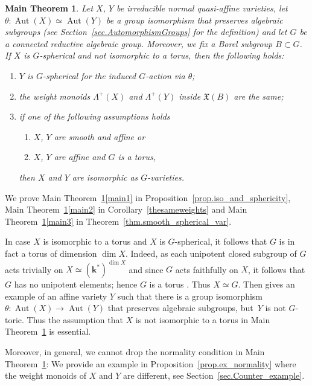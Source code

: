 \documentclass[11pt]{article}
\numberwithin{equation}{section}
\theoremstyle{plain}
\newtheorem{maintheorem}{Main Theorem}
\theoremstyle{definition}
\DeclareMathOperator{\Aut}{Aut}
\newcommand{\kk}{{\boldsymbol{k}}}
\begin{document}
\begin{maintheorem}
\label{mainthm:autos}
Let $X$, $Y$ be irreducible normal quasi-affine varieties, let
$\theta \colon \Aut(X) \simeq \Aut(Y)$ be a group isomorphism
that preserves algebraic subgroups (see Section~\ref{sec.AutomorphismGroups} for the definition)
and let $G$ be a connected reductive
algebraic group.
Moreover, we fix a Borel subgroup $B \subset G$.
If $X$ is $G$-spherical and not isomorphic to a torus, then the following holds:
\begin{enumerate}
\item \label{main1} $Y$ is $G$-spherical for the induced $G$-action via $\theta$;
\item \label{main2} the weight monoids $\Lambda^+(X)$ and $\Lambda^+(Y)$ inside $\mathfrak{X}(B)$
are the same;
\item \label{main3} if one of the following assumptions holds
\begin{enumerate}\renewcommand{\theenumii}{\roman{enumii}}
\item \label{main3smooth} $X$, $Y$ are smooth and affine or
\item \label{main3toric} $X$, $Y$ are affine and $G$ is a torus,
\end{enumerate}
then $X$ and $Y$ are isomorphic as $G$-varieties.
\end{enumerate}
\end{maintheorem}

We prove Main Theorem~\ref{mainthm:autos}\eqref{main1} in Proposition~\ref{prop.iso_and_sphericity},
Main Theorem~\ref{mainthm:autos}\eqref{main2} in Corollary~\ref{thesameweights}
and Main Theorem~\ref{mainthm:autos}\eqref{main3} in Theorem~\ref{thm.smooth_spherical_var}.

In case $X$ is isomorphic to a torus and $X$ is $G$-spherical, it follows that $G$ is in fact a torus
of dimension $\dim X$. Indeed, as each unipotent closed subgroup of $G$ acts trivially on
$X \simeq (\kk^\ast)^{\dim X}$ and since $G$ acts faithfully on $X$, it follows that $G$ has no unipotent
elements; hence $G$ is a torus \cite[Prop.\,B, \S21.4]{Hu1975Linear-algebraic-g}. Thus $X\simeq G$.
Then \cite[Exam.\,6.17]{LiReUr2018Characterization-o} gives an example
of an affine variety $Y$ such that there is a group isomorphism $\theta \colon \Aut(X) \to \Aut(Y)$
that preserves algebraic subgroups, but~$Y$ is not $G$-toric. Thus the assumption that $X$ is
not isomorphic to a torus in Main Theorem~\ref{mainthm:autos} is essential.

Moreover, in general, we cannot drop the normality condition in Main Theorem~\ref{mainthm:autos}:
We provide an example in Proposition~\ref{prop.ex_normality} where the weight monoids of $X$ and $Y$ are different,
see Section~\ref{sec.Counter_example}.
\end{document}
